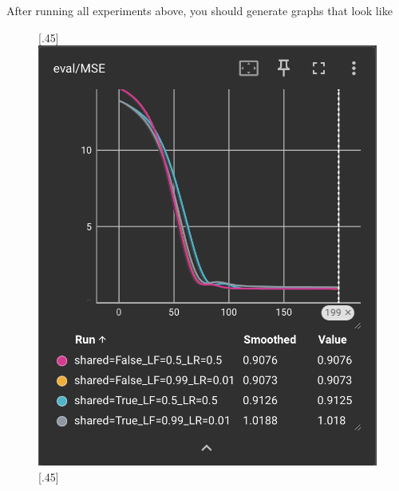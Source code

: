 After running all experiments above, you should generate graphs that look like

\begin{figure}[H]
    [.45\linewidth]{%
        \includegraphics[width=\linewidth]{./figures/eval_MSE}%
    }%
    \hfill
    [.45\linewidth]{%
}
\end{figure}

